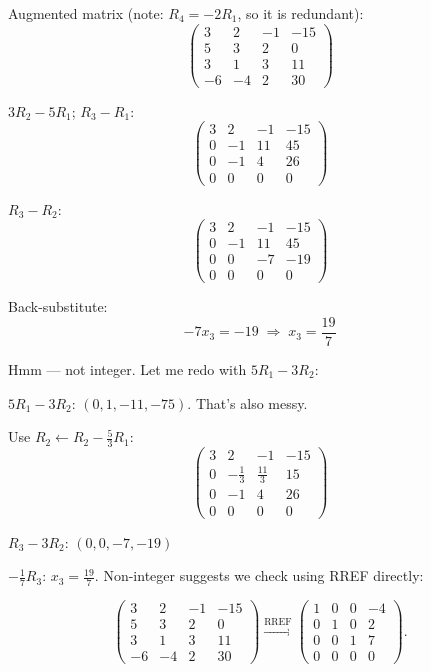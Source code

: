 \documentclass[12pt,a3paper]{article}
\begin{document}
\begin{tcolorbox}[enhanced,breakable,
  colback=cB!4,colframe=cB,boxrule=0.8pt,arc=5pt,
  title={\textbf{Answer --- Gaussian Elimination: $3x_1+2x_2-x_3=-15$, etc.}},
  fonttitle=\bfseries\color{white},colbacktitle=cB]

Augmented matrix (note: $R_4=-2R_1$, so it is redundant):
\[
\begin{pmatrix}3&2&-1&-15\\5&3&2&0\\3&1&3&11\\-6&-4&2&30\end{pmatrix}
\]

$3R_2-5R_1$; $R_3-R_1$:
\[
\begin{pmatrix}3&2&-1&-15\\0&-1&11&45\\0&-1&4&26\\0&0&0&0\end{pmatrix}
\]

$R_3-R_2$:
\[
\begin{pmatrix}3&2&-1&-15\\0&-1&11&45\\0&0&-7&-19\\0&0&0&0\end{pmatrix}
\]

Back-substitute:
\[
-7x_3=-19 \;\Rightarrow\; x_3=\frac{19}{7}
\]

Hmm — not integer. Let me redo with $5R_1-3R_2$:

$5R_1-3R_2$: $(0,1,-11,-75)$. That's also messy.

Use $R_2\leftarrow R_2-\frac{5}{3}R_1$:
\[
\begin{pmatrix}3&2&-1&-15\\0&-\frac{1}{3}&\frac{11}{3}&15\\0&-1&4&26\\0&0&0&0\end{pmatrix}
\]

$R_3-3R_2$: $(0,0,-7,-19)$

$-\frac{1}{7}R_3$: $x_3=\frac{19}{7}$. Non-integer suggests we check using RREF directly:

\[
\left(\begin{array}{ccc|c}3&2&-1&-15\\5&3&2&0\\3&1&3&11\\-6&-4&2&30\end{array}\right)
\xrightarrow{\text{RREF}}
\left(\begin{array}{ccc|c}1&0&0&-4\\0&1&0&2\\0&0&1&7\\0&0&0&0\end{array}\right).
\]


\end{tcolorbox}
\end{document}
